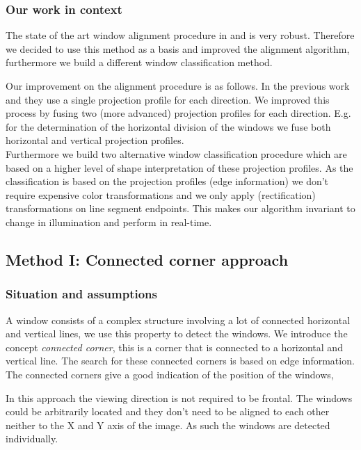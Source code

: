 \subsubsection{Our work in context}
The state of the art window alignment procedure in \cite{Recky_kmeans} and \cite{Lee_extraction}
is very robust.  Therefore we decided to use this method as a basis and improved
the alignment algorithm, furthermore we build a different window classification method.  

Our improvement on the alignment procedure is as follows.
In the previous work \cite{Recky_kmeans} and \cite{Lee_extraction} they use
a single projection profile for each direction.  We improved this 
process by fusing two (more advanced) projection profiles for each direction.
E.g. for the determination of the horizontal division of the windows we fuse both
horizontal and vertical projection profiles.\\

Furthermore we build two alternative window classification procedure which are 
based on a higher level of shape interpretation of these projection profiles.
As the classification is based on the projection profiles (edge information) we
don't require expensive color transformations and we only apply (rectification)
transformations on line segment endpoints. This makes our algorithm invariant to
change in illumination and perform in real-time.  
	










\subsection{Method I: Connected corner approach} 
\subsubsection{Situation and assumptions}
A window consists of a complex structure involving a lot of connected horizontal
and vertical lines, we use this property to detect the windows. 
We introduce the concept \emph{connected corner}, this is a corner that is 
connected to a horizontal and vertical line.  
The search for these connected corners is based on edge information.
The connected corners give a good indication of the position of the windows, 

In this approach the viewing direction is not required to be frontal.
The windows could be arbitrarily located and they don't need
to be aligned to each other neither to the X and Y axis of the image.
As such the windows are detected individually.

